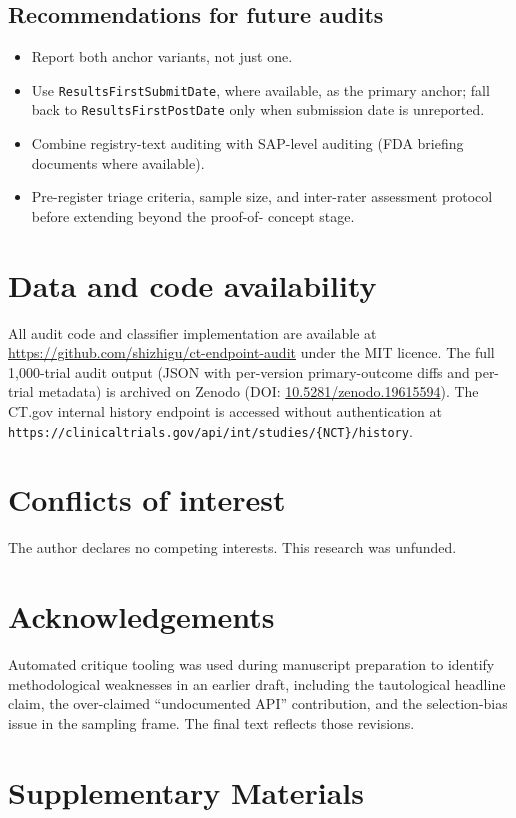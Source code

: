 \documentclass[11pt,a4paper]{article}
\begin{document}
\subsection{Recommendations for future audits}
\begin{itemize}\setlength\itemsep{0.2em}
    \item Report both anchor variants, not just one.
    \item Use \texttt{ResultsFirstSubmitDate}, where available, as the
          primary anchor; fall back to \texttt{ResultsFirstPostDate}
          only when submission date is unreported.
    \item Combine registry-text auditing with SAP-level auditing
          (FDA briefing documents where available).
    \item Pre-register triage criteria, sample size, and inter-rater
          assessment protocol before extending beyond the proof-of-
          concept stage.
\end{itemize}

\section*{Data and code availability}
All audit code and classifier implementation are available at
\url{https://github.com/shizhigu/ct-endpoint-audit} under the MIT
licence. The full 1{,}000-trial audit output (JSON with per-version
primary-outcome diffs and per-trial metadata) is archived on Zenodo
(DOI: \href{https://doi.org/10.5281/zenodo.19615594}{10.5281/zenodo.19615594}).
The CT.gov internal history endpoint is accessed without
authentication at
\texttt{https://clinicaltrials.gov/api/int/studies/\{NCT\}/history}.

\section*{Conflicts of interest}
The author declares no competing interests. This research was unfunded.

\section*{Acknowledgements}
Automated critique tooling was used during manuscript preparation to
identify methodological weaknesses in an earlier draft, including
the tautological headline claim, the over-claimed ``undocumented
API'' contribution, and the selection-bias issue in the sampling
frame. The final text reflects those revisions.




\clearpage
\appendix

\section*{Supplementary Materials}


\end{document}
